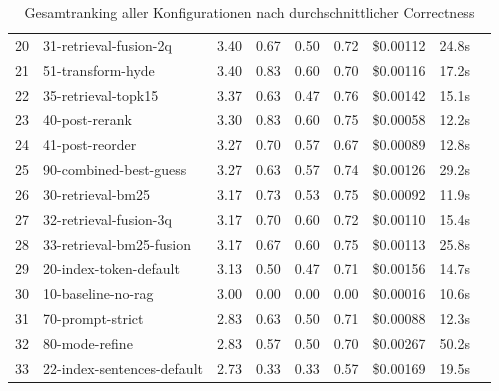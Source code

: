 \begin{table}[H]
\begin{tabular}{rllcccccc}
20 & 31-retrieval-fusion-2q & 3.40 & 0.67 & 0.50 & 0.72 & \$0.00112 & 24.8s \\
21 & 51-transform-hyde & 3.40 & 0.83 & 0.60 & 0.70 & \$0.00116 & 17.2s \\
22 & 35-retrieval-topk15 & 3.37 & 0.63 & 0.47 & 0.76 & \$0.00142 & 15.1s \\
23 & 40-post-rerank & 3.30 & 0.83 & 0.60 & 0.75 & \$0.00058 & 12.2s \\
24 & 41-post-reorder & 3.27 & 0.70 & 0.57 & 0.67 & \$0.00089 & 12.8s \\
25 & 90-combined-best-guess & 3.27 & 0.63 & 0.57 & 0.74 & \$0.00126 & 29.2s \\
26 & 30-retrieval-bm25 & 3.17 & 0.73 & 0.53 & 0.75 & \$0.00092 & 11.9s \\
27 & 32-retrieval-fusion-3q & 3.17 & 0.70 & 0.60 & 0.72 & \$0.00110 & 15.4s \\
28 & 33-retrieval-bm25-fusion & 3.17 & 0.67 & 0.60 & 0.75 & \$0.00113 & 25.8s \\
29 & 20-index-token-default & 3.13 & 0.50 & 0.47 & 0.71 & \$0.00156 & 14.7s \\
30 & 10-baseline-no-rag & 3.00 & 0.00 & 0.00 & 0.00 & \$0.00016 & 10.6s \\
31 & 70-prompt-strict & 2.83 & 0.63 & 0.50 & 0.71 & \$0.00088 & 12.3s \\
32 & 80-mode-refine & 2.83 & 0.57 & 0.50 & 0.70 & \$0.00267 & 50.2s \\
33 & 22-index-sentences-default & 2.73 & 0.33 & 0.33 & 0.57 & \$0.00169 & 19.5s \\
\bottomrule
\end{tabular}
\caption{Gesamtranking aller Konfigurationen nach durchschnittlicher Correctness}
\label{tab:overall_ranking}
\end{table}